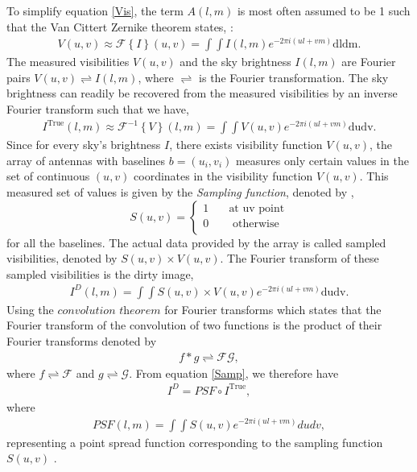 To simplify equation \ref{Vis}, the term $A(l,m)$ is most often assumed to be 1 such that the Van Cittert Zernike theorem states, \citep{thompson2017interferometry}:
\begin{align}
V(u,v)\approx \mathcal{F}\left\{I\right\}(u,v)=\int \int I (l,m)e^{-2\pi i(ul+vm)} \mathrm{dl dm}.
\label{V}
\end{align}
The measured visibilities $V(u,v)$ and the sky brightness  $I(l,m)$ are Fourier pairs $V(u,v) \rightleftharpoons I(l,m)$, where $\rightleftharpoons$ is the Fourier transformation. The sky
brightness can readily be recovered from the measured visibilities by an inverse Fourier transform such that we have, 
\begin{align}
I^{\mathrm{True}}(l,m)\approx \mathcal{F}^{-1}\left\{V\right\}(l,m)=\int \int V (u,v)e^{-2\pi i(ul+vm)} \mathrm{du dv} .
\end{align}
Since for every sky's brightness $I$, there exists visibility function $V(u,v)$, the array of antennas with baselines $b=(u_i,v_i)$  measures only certain values in the set of continuous  $(u,v)$ coordinates in the visibility function $V(u,v)$. This measured set of values is given by the \emph{Sampling function}, denoted by \citep{taylor1999synthesis}, \[ S(u,v) =
  \begin{cases}
    1   & \quad    \text{at uv point}\\
    0  & \quad  \text{ otherwise}\\
  \end{cases}
\] for all the baselines. The actual data provided by the array is called  sampled visibilities, denoted by  $S(u,v)\times V(u,v)$. The Fourier transform of these sampled visibilities is the dirty image,
\begin{align}
I^{D}(l,m)=\int \int S(u,v)\times V(u,v) e^{-2\pi i(ul+vm)} \mathrm{du dv}.
\label{Samp}
\end{align} 
Using the $\textit{convolution theorem}$ for Fourier transforms which states that the Fourier transform of the convolution of two functions is the product of their Fourier transforms denoted by 
\begin{align}
f*g\rightleftharpoons \mathcal{F} \mathcal{G},
\end{align}
where $f\rightleftharpoons \mathcal{F}$ and $g\rightleftharpoons \mathcal{G}$.
From equation \ref{Samp}, we therefore have 
\begin{align}
I^{D}=PSF \circ I^{\mathrm{True}}, 
\end{align}
where 
\begin{align}
PSF(l,m) = \int \int S(u,v)e^{-2\pi i(ul+vm)} du dv,
\end{align}
representing a point spread function  corresponding to the sampling function $S(u,v)$ \citep{taylor1999synthesis}.


